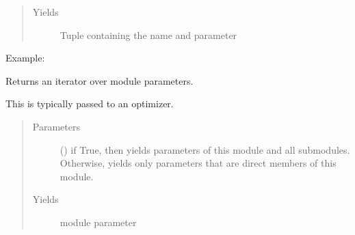 \documentclass[letterpaper,10pt,english]{sphinxmanual}
\begin{document}
\begin{fulllineitems}
\begin{fulllineitems}
\begin{quote}
\begin{description}
\begin{itemize}
\end{itemize}

\item[{Yields}] \leavevmode
{} \textendash{} Tuple containing the name and parameter

\end{description}\end{quote}

Example:

\begin{sphinxVerbatim}[commandchars=\\\{\}]
    
      \PYG{p}{[}\PYG{p}{]}
       
\end{sphinxVerbatim}

\end{fulllineitems}


\begin{fulllineitems}
\label{\detokenize{api/dynamics:geology.metamodelling.dynamics.NeuralDifferentialEquation.parameters}}
Returns an iterator over module parameters.

This is typically passed to an optimizer.
\begin{quote}\begin{description}
\item[{Parameters}] \leavevmode
{} () \textendash{} if True, then yields parameters of this module
and all submodules. Otherwise, yields only parameters that
are direct members of this module.

\item[{Yields}] \leavevmode
{} \textendash{} module parameter


\end{description}
\end{quote}
\end{fulllineitems}
\end{fulllineitems}
\end{document}
